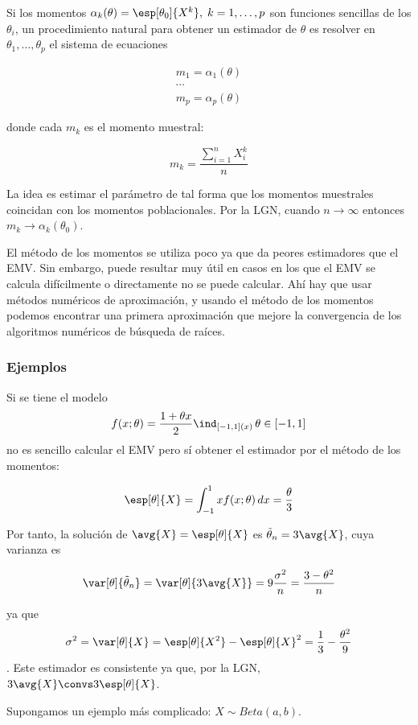 \documentclass{apuntes}
\begin{document}
Si los momentos $\alpha_k(\theta) = \esp[\theta_0]{X^k},\;k=1,\dotsc,p$ son funciones sencillas de los $\theta_i$, un procedimiento natural para obtener un estimador de $\theta$ es resolver en $\theta_1,\dotsc,\theta_p$ el sistema de ecuaciones

\begin{gather*}
m_1 = \alpha_1(\theta) \\
\dotsb \\
m_p = \alpha_p(\theta) 
\end{gather*}

donde cada $m_k$ es el momento muestral:

\[ m_k = \frac{\sum_{i=1}^n X_i^k}{n} \]

La idea es estimar el parámetro de tal forma que los momentos muestrales coincidan con los momentos poblacionales. Por la LGN, cuando $n\to\infty$ entonces $m_k \to \alpha_k(\theta_0)$. 

El método de los momentos se utiliza poco ya que da peores estimadores que el EMV. Sin embargo, puede resultar muy útil en casos en los que el EMV se calcula difícilmente o directamente no se puede calcular. Ahí hay que usar métodos numéricos de aproximación, y usando el método de los momentos podemos encontrar una primera aproximación que mejore la convergencia de los algoritmos numéricos de búsqueda de raíces.

\subsubsection{Ejemplos}

Si se tiene el modelo \[f(x;\theta) = \frac{1+\theta x}{2}\ind_{[-1,1](x)}\,\theta\in[-1,1] \] no es sencillo calcular el EMV pero sí obtener el estimador por el método de los momentos:

\[ \esp[\theta]{X} = \int_{-1}^1 x f(x;\theta)\,dx = \frac{\theta}{3} \]

Por tanto, la solución de $\avg{X} = \esp[\theta]{X}$ es $\tilde\theta_n = 3\avg{X}$, cuya varianza es 

\[ \var[\theta]{\tilde\theta_n} = \var[\theta]{3\avg{X}} = 9\frac{\sigma^2}{n} = \frac{3-\theta^2}{n} \]

ya que \[ \sigma^2 = \var[\theta]{X}= \esp[\theta]{X^2} - \esp[\theta]{X}^2 = \frac{1}{3}-\frac{\theta^2}{9} \]. Este estimador es consistente ya que, por la LGN, $3\avg{X} \convs 3\esp[\theta]{X}$.

Supongamos un ejemplo más complicado: $X\sim Beta(a,b)$.
\end{document}
